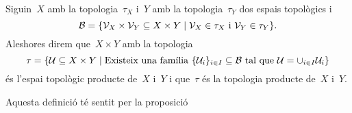 \documentclass[../../main.tex]{subfiles}
\begin{document}
    \begin{definition}
        \label{def:topologia producte}
        Siguin~\(X\) amb la topologia~\(\tau_{X}\) i~\(Y\) amb la topologia~\(\tau_{Y}\) dos espais topològics i
        \[
            \mathcal{B}=\{\mathcal{V}_{X}\times\mathcal{V}_{Y}\subseteq X\times Y\mid\mathcal{V}_{X}\in\tau_{X}\text{ i }\mathcal{V}_{Y}\in\tau_{Y}\}.
        \]
        Aleshores direm que~\(X\times Y\) amb la topologia
        \[
            \tau=\{\mathcal{U}\subseteq X\times Y\mid\text{Existeix una família }\{\mathcal{U}_{i}\}_{i\in I}\subseteq\mathcal{B}\text{ tal que }\mathcal{U}=\cup_{i\in I}\mathcal{U}_{i}\}
        \]
        és l'espai topològic producte de~\(X\) i~\(Y\) i que~\(\tau\) és la topologia producte de~\(X\) i~\(Y\).

        Aquesta definició té sentit per la proposició 
    \end{definition}
\end{document}
